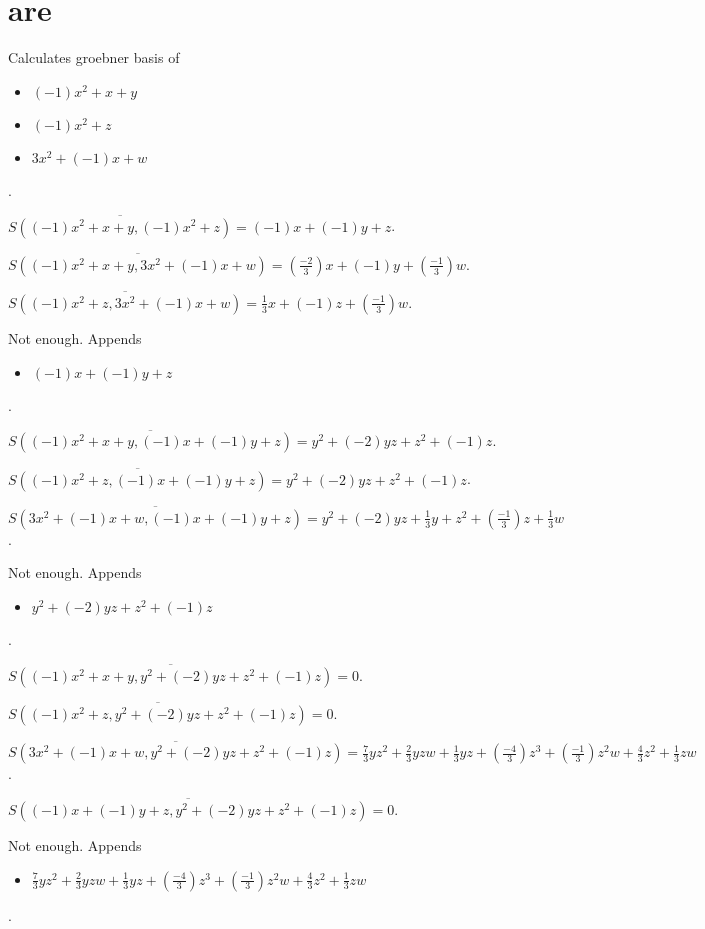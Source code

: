 \documentclass{jsarticle}
\begin{document}
\section{are}Calculates groebner basis of 
\begin{itemize}
\item $(-1)x^{2}+x+y$
\item $(-1)x^{2}+z$
\item $3x^{2}+(-1)x+w$
\end{itemize}  . 


$\overline{S((-1)x^{2}+x+y, (-1)x^{2}+z)} = (-1)x+(-1)y+z$.  

$\overline{S((-1)x^{2}+x+y, 3x^{2}+(-1)x+w)} = (\frac{-2}{3})x+(-1)y+(\frac{-1}{3})w$.  

$\overline{S((-1)x^{2}+z, 3x^{2}+(-1)x+w)} = \frac{1}{3}x+(-1)z+(\frac{-1}{3})w$.  

Not enough.  Appends \begin{itemize}
\item $(-1)x+(-1)y+z$
\end{itemize}  . 


$\overline{S((-1)x^{2}+x+y, (-1)x+(-1)y+z)} = y^{2}+(-2)yz+z^{2}+(-1)z$.  

$\overline{S((-1)x^{2}+z, (-1)x+(-1)y+z)} = y^{2}+(-2)yz+z^{2}+(-1)z$.  

$\overline{S(3x^{2}+(-1)x+w, (-1)x+(-1)y+z)} = y^{2}+(-2)yz+\frac{1}{3}y+z^{2}+(\frac{-1}{3})z+\frac{1}{3}w$.  

Not enough.  Appends \begin{itemize}
\item $y^{2}+(-2)yz+z^{2}+(-1)z$
\end{itemize}  . 


$\overline{S((-1)x^{2}+x+y, y^{2}+(-2)yz+z^{2}+(-1)z)} = 0$.  

$\overline{S((-1)x^{2}+z, y^{2}+(-2)yz+z^{2}+(-1)z)} = 0$.  

$\overline{S(3x^{2}+(-1)x+w, y^{2}+(-2)yz+z^{2}+(-1)z)} = \frac{7}{3}yz^{2}+\frac{2}{3}yzw+\frac{1}{3}yz+(\frac{-4}{3})z^{3}+(\frac{-1}{3})z^{2}w+\frac{4}{3}z^{2}+\frac{1}{3}zw$.  

$\overline{S((-1)x+(-1)y+z, y^{2}+(-2)yz+z^{2}+(-1)z)} = 0$.  

Not enough.  Appends \begin{itemize}
\item $\frac{7}{3}yz^{2}+\frac{2}{3}yzw+\frac{1}{3}yz+(\frac{-4}{3})z^{3}+(\frac{-1}{3})z^{2}w+\frac{4}{3}z^{2}+\frac{1}{3}zw$
\end{itemize}  . 
\end{document}
